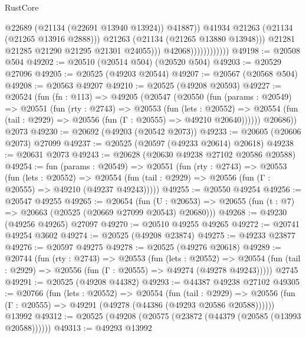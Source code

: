 \begin{lexlean}{RustCore}
\begin{coremodule}
                                          @22689
                                          (@21134 (@22691 @13940 @13924))
                                          @41887))
                                      @41934
                                      @21263
                                      (@21134 (@21265 @13916 @2888)))
                                    @21263
                                    (@21134 (@21265 @13880 @13948)))
                                  @21281
                                  @21285
                                  @21290
                                  @21295
                                  @21301
                                  @24055)))
                            @42068))))))))))))
@49198 := @20508 @504
@49202 := @20510 (@20514 @504) (@20520 @504)
@49203 := @20529 @27096
@49205 := @20525 (@49203 @20544)
@49207 := @20567 (@20568 @504)
@49208 := @20563 @49207
@49210 := @20525 (@49208 @20593)
@49227 := @20524
    (fun (fn : @113) =>
    @49205
      (@20547
        (@20550
          (fun (params : @20549) =>
          @20551
            (fun (rty : @2743) =>
            @20553
              (fun (lets : @20552) =>
              @20554 (fun (tail : @2929) => @20556 (fun (Γ : @20555) => @49210 @20640))))))
        @20686))
    @2073
@49230 := @20692 (@49203 (@20542 @2073))
@49233 := @20605 (@20606 @2073) @27099
@49237 := @20525 (@20597 (@49233 @20614) @20618)
@49238 := @20631 @2073
@49243 := @20628 (@20630 @49238 @27102 @20586 @20588)
@49254 := fun (params : @20549) =>
  @20551
    (fun (rty : @2743) =>
    @20553
      (fun (lets : @20552) =>
      @20554 (fun (tail : @2929) => @20556 (fun (Γ : @20555) => @49210 (@49237 @49243)))))
@49255 := @20550 @49254
@49256 := @20547 @49255
@49265 := @20654
    (fun (U : @20653) => @20655 (fun (t : @7) => @20663 (@20525 (@20669 @27099 @20543) @20680)))
@49268 := @49230 (@49256 @49265) @27097
@49270 := @20510 @49255 @49265
@49272 := @20741 @49254 @3602
@49274 := @20525 (@49208 @23874)
@49275 := @49233 @23877
@49276 := @20597 @49275
@49278 := @20525 (@49276 @20618)
@49289 := @20744
    (fun (rty : @2743) =>
    @20553
      (fun (lets : @20552) =>
      @20554 (fun (tail : @2929) => @20556 (fun (Γ : @20555) => @49274 (@49278 @49243)))))
    @2745
@49291 := @20525 (@49208 @44382)
@49293 := @44387 @49238 @27102
@49305 := @20766
    (fun (lets : @20552) =>
    @20554
      (fun (tail : @2929) =>
      @20556 (fun (Γ : @20555) => @49291 (@49278 (@44386 (@49293 @20586 @20588))))))
    @13992
@49312 := @20525 (@49208 (@20575 (@23872 (@44379 (@20585 (@13993 @20588))))))
@49313 := @49293 @13992

\end{coremodule}
\end{lexlean}
